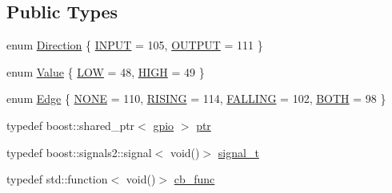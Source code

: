 \subsection*{Public Types}
\begin{DoxyCompactItemize}
\item 
enum \hyperlink{classo_cpt_1_1protocol_1_1gpio_af7acf963933bbc47d11d6fa1b8ce4d5b}{Direction} \{ \hyperlink{classo_cpt_1_1protocol_1_1gpio_af7acf963933bbc47d11d6fa1b8ce4d5bac8229afa7339514d640fdd7512456ec1}{I\+N\+P\+UT} = 105, 
\hyperlink{classo_cpt_1_1protocol_1_1gpio_af7acf963933bbc47d11d6fa1b8ce4d5baa8f40287c9c83f0528feec4792eb1923}{O\+U\+T\+P\+UT} = 111
 \}
\item 
enum \hyperlink{classo_cpt_1_1protocol_1_1gpio_a7d2d1d34f177f209ad642098d168656f}{Value} \{ \hyperlink{classo_cpt_1_1protocol_1_1gpio_a7d2d1d34f177f209ad642098d168656faa2cdaa57258d16622e014ff5d766f095}{L\+OW} = 48, 
\hyperlink{classo_cpt_1_1protocol_1_1gpio_a7d2d1d34f177f209ad642098d168656fade5ff2955239ef2860ee2d06f3be68d4}{H\+I\+GH} = 49
 \}
\item 
enum \hyperlink{classo_cpt_1_1protocol_1_1gpio_adbbd34b2bc4394ad5a71d94641dda9f9}{Edge} \{ \hyperlink{classo_cpt_1_1protocol_1_1gpio_adbbd34b2bc4394ad5a71d94641dda9f9a97a153b16162f7d3ebd04fe1bc59b8f8}{N\+O\+NE} = 110, 
\hyperlink{classo_cpt_1_1protocol_1_1gpio_adbbd34b2bc4394ad5a71d94641dda9f9a33b81c6d79fea86cd39ac781c6038678}{R\+I\+S\+I\+NG} = 114, 
\hyperlink{classo_cpt_1_1protocol_1_1gpio_adbbd34b2bc4394ad5a71d94641dda9f9ad706fd6e134b45f6521f6f10cac1ab3a}{F\+A\+L\+L\+I\+NG} = 102, 
\hyperlink{classo_cpt_1_1protocol_1_1gpio_adbbd34b2bc4394ad5a71d94641dda9f9a4fdd038edea2f194d145a18b371be597}{B\+O\+TH} = 98
 \}
\item 
typedef boost\+::shared\+\_\+ptr$<$ \hyperlink{classo_cpt_1_1protocol_1_1gpio}{gpio} $>$ \hyperlink{classo_cpt_1_1protocol_1_1gpio_acd4fb0fba7a813a8013511b374e73900}{ptr}
\item 
typedef boost\+::signals2\+::signal$<$ void()$>$ \hyperlink{classo_cpt_1_1protocol_1_1gpio_aa875802b20c7ef999c44af68e7f23621}{signal\+\_\+t}
\item 
typedef std\+::function$<$ void()$>$ \hyperlink{classo_cpt_1_1protocol_1_1gpio_ad553926a5fc9db445e7c9715abede2e3}{cb\+\_\+func}
\end{DoxyCompactItemize}
